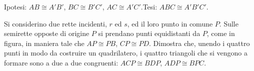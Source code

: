 \begin{inaccessibleblock}
  \begin{figure}[htb]
    \centering
  \end{figure}
\end{inaccessibleblock}

\noindent Ipotesi: \(AB\cong A'B'\), \(BC\cong B'C'\), \(AC\cong 
A'C'\).\tab Tesi: \(ABC\cong A'B'C'\).


\begin{exrig}
% 
% 
% 
% 
% 
% 
\begin{esempio}\label{esempio:2.1}
Si considerino due rette incidenti, \(r\) ed \(s\), ed il loro punto in 
comune \(P\). Sulle semirette opposte di origine \(P\) si prendano punti 
equidistanti da \(P\), come in figura, in maniera tale che \(AP\cong 
PB\), \(CP\cong PD\). Dimostra che, unendo i quattro punti in modo da 
costruire un quadrilatero, i quattro triangoli che si vengono a 
formare sono a due a due congruenti: \(ACP\cong BDP\), \(ADP\cong BPC\).


\end{esempio}
\end{exrig}

